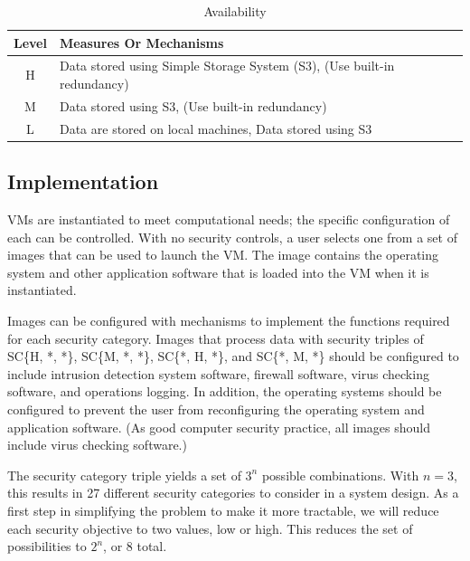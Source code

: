 \documentclass{sig-alternate}
\begin{document}
\begin{table}[ht]
\begin{tabular}{|c|p{2.5in}|}
\hline
Level &  Measures Or Mechanisms \\
\hline
H & Data stored using Simple Storage System (S3),
    (Use built-in redundancy) \\
\hline  
M & Data stored using S3,
    (Use built-in redundancy)\\
\hline
L & Data are stored on local machines,
    Data stored using S3 \\
\hline
\end{tabular}  
\caption{Availability}
\end{table}

\subsection{Implementation}
VMs are instantiated to meet computational needs; the specific configuration of each can be controlled.  With no security controls, a user selects one from a set of images that can be used to launch the VM.  The image contains the operating system and other application software that is loaded into the VM when it is instantiated. 
 
Images can be configured with mechanisms to implement the functions required for each security category.  Images that process data with security triples of  SC\{H, *, *\}, SC\{M, *, *\}, SC\{*, H, *\}, and SC\{*, M, *\} should be configured to include intrusion detection system software, firewall software, virus checking software, and operations logging.  In addition, the operating systems should be configured to prevent the user from reconfiguring the operating system and application software.   (As good computer security practice, all images should include virus checking software.)

The security category triple yields a set of $3^{n}$ possible combinations.  With $n = 3$, this results in 27 different security categories to consider in a system design.  As a first step in simplifying the problem to make it more tractable, we will reduce each security objective to two values, low or high.  This reduces the set of possibilities to $2^{n}$, or 8 total.
\end{document}
